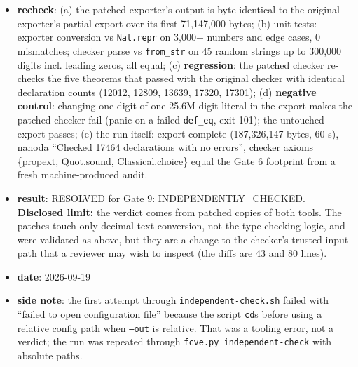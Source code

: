 \documentclass[11pt]{article}
\begin{document}
\begin{itemize}
\item \textbf{recheck}: (a) the patched exporter's output is byte-identical to the original exporter's partial export over its first 71,147,000 bytes; (b) unit tests: exporter conversion vs \texttt{Nat.repr} on 3,000+ numbers and edge cases, 0 mismatches; checker parse vs \texttt{from\_str} on 45 random strings up to 300,000 digits incl. leading zeros, all equal; (c) \textbf{regression}: the patched checker re-checks the five theorems that passed with the original checker with identical declaration counts (12012, 12809, 13639, 17320, 17301); (d) \textbf{negative control}: changing one digit of one 25.6M-digit literal in the export makes the patched checker fail (panic on a failed \texttt{def\_eq}, exit 101); the untouched export passes; (e) the run itself: export complete (187,326,147 bytes, 60 s), nanoda ``Checked 17464 declarations with no errors'', checker axioms \{propext, Quot.sound, Classical.choice\} equal the Gate 6 footprint from a fresh machine-produced audit.
\item \textbf{result}: RESOLVED for Gate 9: INDEPENDENTLY\_CHECKED. \textbf{Disclosed limit:} the verdict comes from patched copies of both tools. The patches touch only decimal text conversion, not the type-checking logic, and were validated as above, but they are a change to the checker's trusted input path that a reviewer may wish to inspect (the diffs are 43 and 80 lines).
\item \textbf{date}: 2026-09-19
\item \textbf{side note}: the first attempt through \texttt{independent-check.sh} failed with ``failed to open configuration file'' because the script \texttt{cd}s before using a relative config path when \texttt{--out} is relative. That was a tooling error, not a verdict; the run was repeated through \texttt{fcve.py independent-check} with absolute paths.
\end{itemize}
\end{document}
